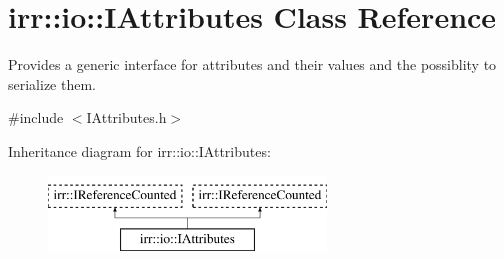 \hypertarget{classirr_1_1io_1_1IAttributes}{}\section{irr\+:\+:io\+:\+:I\+Attributes Class Reference}
\label{classirr_1_1io_1_1IAttributes}


Provides a generic interface for attributes and their values and the possiblity to serialize them.  




{\ttfamily \#include $<$I\+Attributes.\+h$>$}

Inheritance diagram for irr\+:\+:io\+:\+:I\+Attributes\+:\begin{figure}[H]
\begin{center}
\leavevmode
\includegraphics[height=2.000000cm]{classirr_1_1io_1_1IAttributes}
\end{center}
\end{figure}
